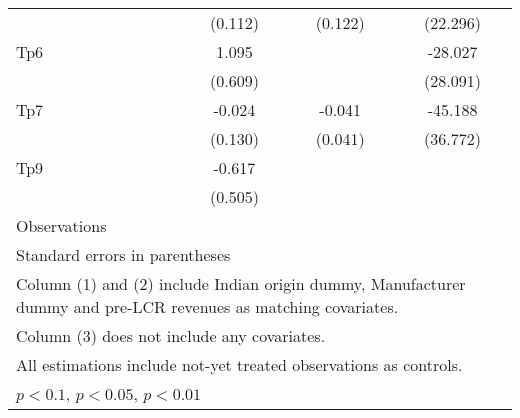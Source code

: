 {\begin{tabular}{l*{3}{c}}
                    &     (0.112)         &     (0.122)         &    (22.296)         \\
[1em]
Tp6                 &       1.095\sym{*}  &                     &     -28.027         \\
                    &     (0.609)         &                     &    (28.091)         \\
[1em]
Tp7                 &      -0.024         &      -0.041         &     -45.188         \\
                    &     (0.130)         &     (0.041)         &    (36.772)         \\
[1em]
Tp9                 &      -0.617         &                     &                     \\
                    &     (0.505)         &                     &                     \\
\hline
Observations        &                     &                     &                     \\
\hline\hline
\multicolumn{4}{l}{\footnotesize Standard errors in parentheses}\\
\multicolumn{4}{l}{\footnotesize Column (1) and (2) include Indian origin dummy, Manufacturer dummy and pre-LCR revenues as matching covariates.}\\
\multicolumn{4}{l}{\footnotesize Column (3) does not include any covariates.}\\
\multicolumn{4}{l}{\footnotesize All estimations include not-yet treated observations as controls.}\\
\multicolumn{4}{l}{\footnotesize \sym{*} \(p<0.1\), \sym{**} \(p<0.05\), \sym{***} \(p<0.01\)}\\
\end{tabular}
}
